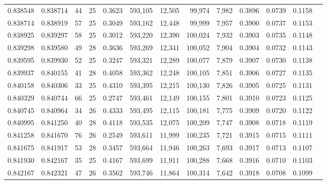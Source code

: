 \begin{tabular}{rrrrrrrrrrrrr}
0.838548 & 0.838714 &    44 &  25 &                                     0.3623 & 593,105 &  12,505 &  99,974 &   7,982 & 0.3896 & 0.0739 & 0.1158 \\
0.838714 & 0.838919 &    57 &  25 &                                     0.3049 & 593,162 &  12,448 &  99,999 &   7,957 & 0.3900 & 0.0737 & 0.1153 \\
0.838925 & 0.839297 &    58 &  25 &                                     0.3012 & 593,220 &  12,390 & 100,024 &   7,932 & 0.3903 & 0.0735 & 0.1148 \\
0.839298 & 0.839580 &    49 &  28 &                                     0.3636 & 593,269 &  12,341 & 100,052 &   7,904 & 0.3904 & 0.0732 & 0.1143 \\
0.839595 & 0.839930 &    52 &  25 &                                     0.3247 & 593,321 &  12,289 & 100,077 &   7,879 & 0.3907 & 0.0730 & 0.1138 \\
0.839937 & 0.840155 &    41 &  28 &                                     0.4058 & 593,362 &  12,248 & 100,105 &   7,851 & 0.3906 & 0.0727 & 0.1135 \\
0.840158 & 0.840306 &    33 &  25 &                                     0.4310 & 593,395 &  12,215 & 100,130 &   7,826 & 0.3905 & 0.0725 & 0.1131 \\
0.840329 & 0.840744 &    66 &  25 &                                     0.2747 & 593,461 &  12,149 & 100,155 &   7,801 & 0.3910 & 0.0723 & 0.1125 \\
0.840745 & 0.840964 &    34 &  26 &                                     0.4333 & 593,495 &  12,115 & 100,181 &   7,775 & 0.3909 & 0.0720 & 0.1122 \\
0.840995 & 0.841250 &    40 &  28 &                                     0.4118 & 593,535 &  12,075 & 100,209 &   7,747 & 0.3908 & 0.0718 & 0.1119 \\
0.841258 & 0.841670 &    76 &  26 &                                     0.2549 & 593,611 &  11,999 & 100,235 &   7,721 & 0.3915 & 0.0715 & 0.1111 \\
0.841675 & 0.841917 &    53 &  28 &                                     0.3457 & 593,664 &  11,946 & 100,263 &   7,693 & 0.3917 & 0.0713 & 0.1107 \\
0.841930 & 0.842167 &    35 &  25 &                                     0.4167 & 593,699 &  11,911 & 100,288 &   7,668 & 0.3916 & 0.0710 & 0.1103 \\
0.842167 & 0.842321 &    47 &  26 &                                     0.3562 & 593,746 &  11,864 & 100,314 &   7,642 & 0.3918 & 0.0708 & 0.1099 \\

\end{tabular}
